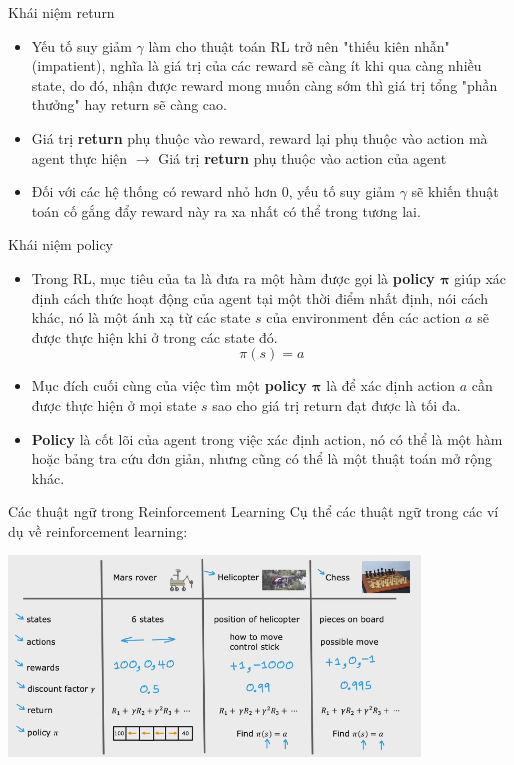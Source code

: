 \documentclass[10pt,aspectratio=169]{beamer}
\begin{document}
\begin{frame}{Khái niệm return}{\subsecname}
\begin{itemize}
\setlength\itemsep{8pt}
\item Yếu tố suy giảm $ \gamma $ làm cho thuật toán RL trở nên "thiếu kiên nhẫn" (impatient), nghĩa là giá trị của các reward sẽ càng ít khi qua càng nhiều state, do đó, nhận được reward mong muốn càng sớm thì giá trị tổng "phần thưởng" hay return sẽ càng cao.
\item Giá trị \textbf{return} phụ thuộc vào reward, reward lại phụ thuộc vào action mà agent thực hiện
$ \rightarrow $ Giá trị \textbf{return} phụ thuộc vào action của agent
\item Đối với các hệ thống có reward nhỏ hơn 0, yếu tố suy giảm $ \gamma $ sẽ khiến thuật toán cố gắng đẩy reward này ra xa nhất có thể trong tương lai.
\end{itemize}
\end{frame}

\begin{frame}{Khái niệm policy}{\subsecname}
\begin{itemize}
\setlength\itemsep{8pt}
\item Trong RL, mục tiêu của ta là đưa ra một hàm được gọi là \textbf{policy $ \boldsymbol{\pi} $} giúp xác định cách thức hoạt động của agent tại một thời điểm nhất định, nói cách khác, nó là một ánh xạ từ các state $ s $ của environment đến các action $ a $ sẽ được thực hiện khi ở trong các state đó.
\begin{equation*}
\pi(s) = a
\end{equation*}
\item Mục đích cuối cùng của việc tìm một \textbf{policy $ \boldsymbol{\pi} $} là để xác định action $ a $ cần được thực hiện ở mọi state $ s $ sao cho giá trị return đạt được là tối đa.
\item \textbf{Policy} là cốt lõi của agent trong việc xác định action, nó có thể là một hàm hoặc bảng tra cứu đơn giản, nhưng cũng có thể là một thuật toán mở rộng khác.
\end{itemize}
\end{frame}

\begin{frame}{Các thuật ngữ trong Reinforcement Learning}
Cụ thể các thuật ngữ trong các ví dụ về reinforcement learning:
\begin{center}
\includegraphics[width=0.82\textwidth]{source/6.png}\\
\end{center}
\end{frame}
\end{document}
